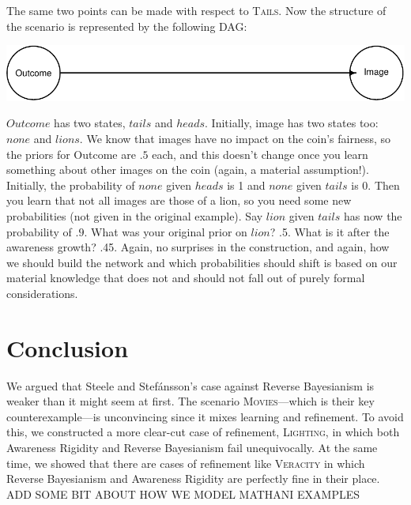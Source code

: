 \documentclass[
  11pt,
  dvipsnames,enabledeprecatedfontcommands]{scrartcl}
\begin{document}
The same two points can be made with respect to \textsc{Tails}. Now the
structure of the scenario is represented by the following DAG:

\begin{center}\includegraphics[width=0.5\linewidth,height=0.3\textheight]{ReplyToSteeleStefansson2_files/figure-latex/tailsDAG-1} \end{center}

\(Outcome\) has two states, \(tails\) and \(heads\). Initially, image
has two states too: \(none\) and \(lions\). We know that images have no
impact on the coin's fairness, so the priors for Outcome are \(.5\)
each, and this doesn't change once you learn something about other
images on the coin (again, a material assumption!). Initially, the
probability of \(none\) given \(heads\) is 1 and \(none\) given
\(tails\) is 0. Then you learn that not all images are those of a lion,
so you need some new probabilities (not given in the original example).
Say \(lion\) given \(tails\) has now the probability of \(.9\). What was
your original prior on \(lion\)? .5. What is it after the awareness
growth? .45. Again, no surprises in the construction, and again, how we
should build the network and which probabilities should shift is based
on our material knowledge that does not and should not fall out of
purely formal considerations.

\hypertarget{conclusion}{%
\section{Conclusion}\label{conclusion}}

We argued that Steele and Stefánsson's case against Reverse Bayesianism
is weaker than it might seem at first. The scenario
\textsc{Movies}---which is their key counterexample---is unconvincing
since it mixes learning and refinement. To avoid this, we constructed a
more clear-cut case of refinement, \textsc{Lighting}, in which both
Awareness Rigidity and Reverse Bayesianism fail unequivocally. At the
same time, we showed that there are cases of refinement like
\textsc{Veracity} in which Reverse Bayesianism and Awareness Rigidity
are perfectly fine in their place. ADD SOME BIT ABOUT HOW WE MODEL
MATHANI EXAMPLES
\end{document}
